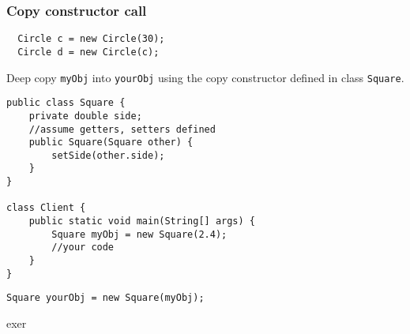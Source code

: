 \subsubsection{Copy constructor call} 
  \begin{lstlisting}
  Circle c = new Circle(30);
  Circle d = new Circle(c);
  \end{lstlisting} 

\begin{exercise}
Deep copy \texttt{myObj} into \texttt{yourObj} using the copy constructor defined in class \texttt{Square}. 

\begin{lstlisting}[frame=single,style=buggy]
public class Square {
	private double side;
	//assume getters, setters defined
	public Square(Square other) {
		setSide(other.side);
	}
}

class Client {
	public static void main(String[] args) {
		Square myObj = new Square(2.4);
		//your code
	}
}
\end{lstlisting}  	
\end{exercise}
\begin{answer} \begin{lstlisting}
Square yourObj = new Square(myObj);
\end{lstlisting} \end{answer}

exer
